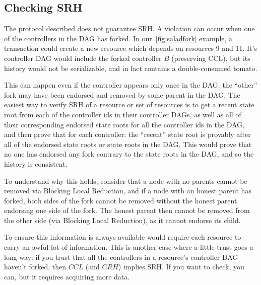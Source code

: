 \documentclass[a4paper,USenglish,cleveref, autoref, thm-restate, anonymous]{lipics-v2021}
\begin{document}
\subsection{Checking SRH}
The protocol described does not guarantee SRH.
A violation can occur when one of the controllers in the DAG has forked.
In our~\cref{fig:saladfork} example, a transaction could create a new resource which depends on resources 9 and 11.
It's controller DAG would include the forked controller $B$ (preserving CCL), but its history would not be serializable, and in fact contains a double-consumed tomato.

This can happen even if the controller appears only once in the DAG: the ``other'' fork may have been endorsed and removed by some parent in the DAG.
The easiest way to verify SRH of a resource or set of resources is to get a recent state root from each of the controller ids in their controller DAGs, as well as all of their corresponding endorsed state roots for all the controller ids in the DAG, and then prove that for each controller: the ``recent'' state root is provably after all of the endorsed state roots or state roots in the DAG.
This would prove that no one has endorsed any fork contrary to the state roots in the DAG, and so the history is consistent. 

To understand why this holds, consider that a node with no parents cannot be removed via Blocking Local Reduction, and if a node with an honest parent has forked, both sides of the fork cannot be removed without the honest parent endorsing one side of the fork.
The honest parent then cannot be removed from the other side (via Blocking Local Reduction), as it cannot endorse its child. 

To ensure this information is always available would require each resource to carry an awful lot of information.
This is another case where a little trust goes a long way: if you trust that all the controllers in a resource's controller DAG haven't forked, then $CCL$ (and $CRH$) implies SRH.
If you want to check, you can, but it requires acquiring more data.











\end{document}
